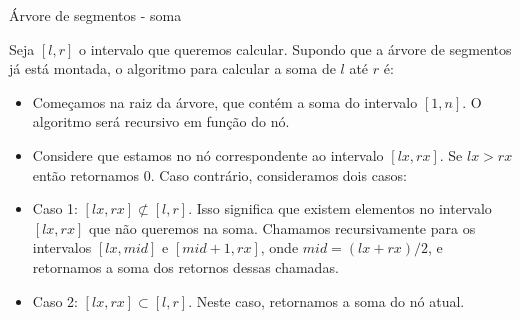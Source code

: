 \begin{frame}{Árvore de segmentos - soma}

    Seja $[l, r]$ o intervalo que queremos calcular. Supondo que a árvore de segmentos já está montada, o algoritmo para calcular a soma de $l$ até $r$ é:
    \begin{itemize}
        \item Começamos na raiz da árvore, que contém a soma do intervalo $[1, n]$. O algoritmo será recursivo em função do nó.
        \item Considere que estamos no nó correspondente ao intervalo $[lx, rx]$. Se $lx > rx$ então retornamos $0$. Caso contrário, consideramos dois casos:
        \item Caso 1: $[lx, rx] \not \subset [l, r]$. Isso significa que existem elementos no intervalo $[lx, rx]$ que não queremos na soma. Chamamos recursivamente para os intervalos $[lx, mid]$ e $[mid+1, rx]$, onde $mid = (lx+rx)/2$, e retornamos a soma dos retornos dessas chamadas.
        \item Caso 2: $[lx, rx] \subset [l, r]$. Neste caso, retornamos a soma do nó atual.
    \end{itemize}


\end{frame}
